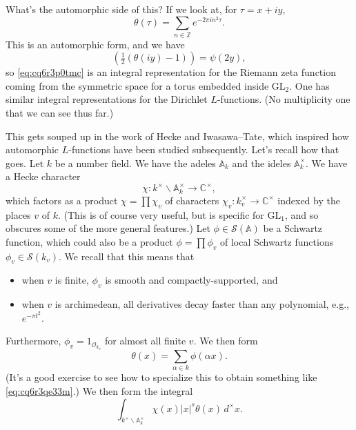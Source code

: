 \documentclass[reqno]{amsart} 
\numberwithin{theorem}{section}
\numberwithin{equation}{section}
\numberwithin{exercise}{section}
\begin{document}
What's the automorphic side of this?  If we look at, for $\tau = x + i y$,
\begin{equation*}
  \theta(\tau) = \sum_{n \in \mathbb{Z}} e^{- 2 \pi i n^2 \tau}.
\end{equation*}
This is an automorphic form, and we have
\begin{equation*}
  (\tfrac{1}{2}(\theta(i y) - 1)) = \psi(2 y),
\end{equation*}
so \eqref{eq:cq6r3p0tmc} is an integral representation for the Riemann zeta function coming from the symmetric space for a torus embedded inside $\mathrm{GL}_2$.  One has similar integral representations for the Dirichlet $L$-functions.  (No multiplicity one that we can see thus far.)

This gets souped up in the work of Hecke and Iwasawa--Tate, which inspired how automorphic $L$-functions have been studied subsequently.  Let's recall how that goes.  Let $k$ be a number field.  We have the adeles $\mathbb{A}_k$ and the ideles $\mathbb{A}_k^\times$.  We have a Hecke character
\begin{equation*}
  \chi : k^\times \backslash \mathbb{A}_k^\times \rightarrow \mathbb{C}^\times,
\end{equation*}
which factors as a product $\chi = \prod \chi_v$ of characters $\chi_v : k_v^\times \rightarrow \mathbb{C}^\times$ indexed by the places $v$ of $k$.  (This is of course very useful, but is specific for $\mathrm{GL}_1$, and so obscures some of the more general features.)  Let $\phi \in \mathcal{S}(\mathbb{A})$ be a Schwartz function, which could also be a product $\phi = \prod \phi_v$ of local Schwartz functions $\phi_v \in \mathcal{S}(k_v)$.  We recall that this means that
\begin{itemize}
\item when $v$ is finite, $\phi_v$ is smooth and compactly-supported, and
\item when $v$ is archimedean, all derivatives decay faster than any polynomial, e.g., $e^{- \pi t^2}$.
\end{itemize}
Furthermore, $\phi_v = 1_{\mathcal{O}_{k_v}}$ for almost all finite $v$.  We then form
\begin{equation*}
  \theta(x) = \sum_{\alpha \in k} \phi(\alpha x).
\end{equation*}
(It's a good exercise to see how to specialize this to obtain something like \eqref{eq:cq6r3qe33m}.)  We then form the integral
\begin{equation*}
  \int_{k^\times \backslash \mathbb{A}_k^\times} \chi(x) \lvert x \rvert^s \theta(x) \,d^\times x.
\end{equation*}
\end{document}
